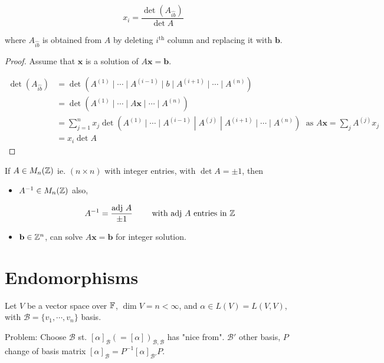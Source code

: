 \documentclass[a4paper]{article}
\begin{document}
\[ x_{i} = \frac{\det(A_{\hat{ib}})}{\det A} \]

where $ A_{\hat{ib}} $ is obtained from $ A $ by deleting $ i^{\text{th}} $ column and replacing it with $ \mathbf{b} $.

\begin{proof}
	Assume that $ \mathbf{x} $ is a solution of $ A \mathbf{x} = \mathbf{b} $.
	
	\begin{align*}
	\det(A_{\hat{ib}})& = \det (  A^{(1)} \; | \; \cdots \; | \; A^{(i-1)} \; | \; b \; | \; A^{(i+1)} \; | \; \cdots \; | \; A^{(n)} ) \\
	& = \det (  A^{(1)} \; | \; \cdots \; | \; A\mathbf{x} \; | \; \cdots \; | \; A^{(n)} ) \\
	& = \sum_{j=1}^{n} x_{j} \det (  A^{(1)} \; | \; \cdots \; | \; A^{(i-1)} \; | \; A^{(j)} \; | \; A^{(i+1)} \; | \; \cdots \; | \; A^{(n)} ) \; \text{ as } A\mathbf{x} = \sum_{j} A^{(j)}x_{j} \\ 
	& = x_{i} \det A
	\end{align*}	
\end{proof}

\begin{cor} 
	If $ A \in M_{n}(\mathbb{Z}) $ ie. $ (n \times n) $ with integer entries, with $ \det A = \pm 1 $, then 
	
	\begin{itemize}
		\item $ A^{-1} \in M_{n}(\mathbb{Z}) $ also, 
		
		\[ A^{-1} = \frac{\text{adj }A}{\pm 1} \qquad \text{ with adj } A \text{ entries in } \mathbb{Z}  \]
		
		\item $ \mathbf{b} \in \mathbb{Z}^{n} $, can solve $ A \mathbf{x} = \mathbf{b} $ for integer solution. 
	\end{itemize}
\end{cor}

	
	
\section{Endomorphisms}

Let $ V $ be a vector space over $ \mathbb{F} $, $ \dim V = n < \infty $, and $ \alpha \in L(V) = L(V,V) $, with $ \mathcal{B} = \{  v_{1},\cdots,v_{n} \} $ basis. 

Problem: Choose $ \mathcal{B} $ st. $ [\alpha]_{\mathcal{B}} ( = [\alpha])_{\mathcal{B},\mathcal{B}} $ has "nice from". $ \mathcal{B}' $ other basis, $ P $ change of basis matrix $ [ \alpha]_{\mathcal{B}} = P^{-1} [\alpha]_{\mathcal{B}'}P $.
\end{document}
